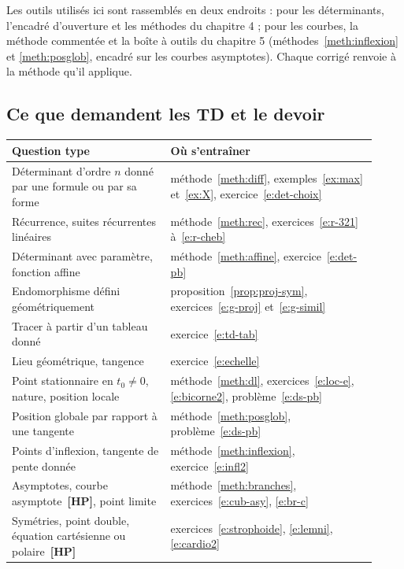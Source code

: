 \documentclass[a4paper,11pt]{article}
\numberwithin{equation}{section}
\numberwithin{figure}{section}
\numberwithin{table}{section}
\theoremstyle{enonce}
\theoremstyle{exemple}
\theoremstyle{remarque}
\newcommand{\HP}{\,{\sffamily\bfseries\scriptsize\textcolor{Brique}{[HP]}}}
\begin{document}
\begin{commencer}
Les outils utilisés ici sont rassemblés en deux endroits : pour les déterminants, l'encadré d'ouverture et les méthodes du
chapitre 4 ; pour les courbes, la méthode commentée et la boîte à outils du chapitre 5 (méthodes~\ref{meth:inflexion} et
\ref{meth:posglob}, encadré sur les courbes asymptotes). Chaque corrigé renvoie à la méthode qu'il applique.
\end{commencer}

\subsection{Ce que demandent les TD et le devoir}

\begin{center}
\renewcommand{\arraystretch}{1.3}\small
\begin{tabular}{>{\raggedright}p{0.4\linewidth}>{\raggedright\arraybackslash}p{0.52\linewidth}}
\toprule
\sffamily Question type & \sffamily Où s'entraîner\\\midrule
Déterminant d'ordre $n$ donné par une formule ou par sa forme & méthode~\ref{meth:diff}, exemples~\ref{ex:max} et~\ref{ex:X}, exercice~\ref{e:det-choix}\\
Récurrence, suites récurrentes linéaires & méthode~\ref{meth:rec}, exercices~\ref{e:r-321} à~\ref{e:r-cheb}\\
Déterminant avec paramètre, fonction affine & méthode~\ref{meth:affine}, exercice~\ref{e:det-pb}\\
Endomorphisme défini géométriquement & proposition~\ref{prop:proj-sym}, exercices~\ref{e:g-proj} et~\ref{e:g-simil}\\\midrule
Tracer à partir d'un tableau donné & exercice~\ref{e:td-tab}\\
Lieu géométrique, tangence & exercice~\ref{e:echelle}\\
Point stationnaire en $t_0\neq0$, nature, position locale & méthode~\ref{meth:dl}, exercices~\ref{e:loc-e}, \ref{e:bicorne2}, problème~\ref{e:ds-pb}\\
Position globale par rapport à une tangente & méthode~\ref{meth:posglob}, problème~\ref{e:ds-pb}\\
Points d'inflexion, tangente de pente donnée & méthode~\ref{meth:inflexion}, exercice~\ref{e:infl2}\\
Asymptotes, courbe asymptote \HP, point limite & méthode~\ref{meth:branches}, exercices~\ref{e:cub-asy}, \ref{e:br-c}\\
Symétries, point double, équation cartésienne ou polaire \HP & exercices~\ref{e:strophoide}, \ref{e:lemni}, \ref{e:cardio2}\\\bottomrule
\end{tabular}
\end{center}
\end{document}
